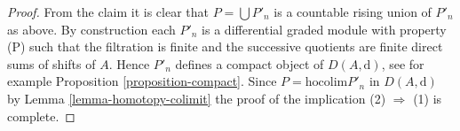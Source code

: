 \documentclass{amsart}
\theoremstyle{plain}
\theoremstyle{definition}
\theoremstyle{remark}
\numberwithin{equation}{subsection}
\begin{document}
\begin{proof}
\medskip\noindent
From the claim it is clear that $P = \bigcup P'_n$
is a countable rising union of $P'_n$ as above.
By construction each $P'_n$ is a differential graded module with
property (P) such that the filtration is finite and the successive
quotients are finite direct sums of shifts of $A$. Hence $P'_n$
defines a compact object of $D(A, \text{d})$, see for example
Proposition \ref{proposition-compact}. Since
$P = \text{hocolim} P'_n$ in $D(A, \text{d})$
by Lemma \ref{lemma-homotopy-colimit}
the proof of the implication (2) $\Rightarrow$ (1) is complete.
\end{proof}
\end{document}
